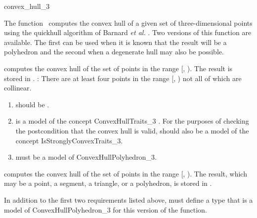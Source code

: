\begin{ccRefFunction}{convex_hull_3}

\ccDefinition

The function \ccRefName\ computes the convex hull of a given set of 
three-dimensional points using the quickhull algorithm of Barnard
\textit{et al.} \cite{bdh-qach-96}.  Two versions of this function 
are available.  The first can be used when it is known that the result
will be a polyhedron and the second when a degenerate hull
may also be possible.


{
computes the convex hull of the set of points in the range
[, ).  The result is stored in .
\ccPrecond: There are at least four points in the range 
[, ) not all of which are collinear.
}

\begin{enumerate}
   \item {} should be .
   \item {} is a model of the concept ConvexHullTraits\_3
         .
         For the purposes of checking the postcondition that the convex hull
         is valid,  should also be a model of the concept
         IsStronglyConvexTraits\_3.
  \item {} must be a model of ConvexHullPolyhedron\_3.
\end{enumerate}

{
computes the convex hull of the set of points in the range
[, ).  The result, which may be a point, a segment,
a triangle, or a polyhedron, is stored in .
}

In addition to the first two requirements listed above,  must
define a type  that is a model of ConvexHullPolyhedron\_3
for this version of the function. 


\end{ccRefFunction}
